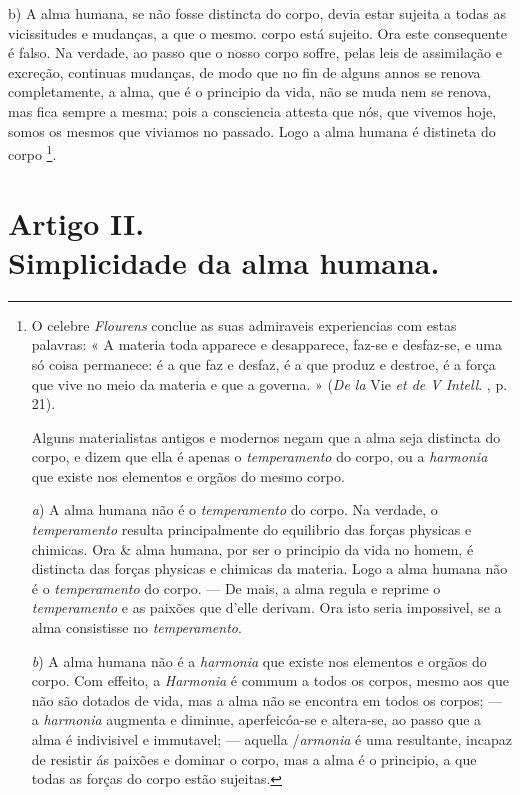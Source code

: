 b) A alma humana, se não fosse distincta do corpo, devia estar sujeita a todas as vicissitudes e mudanças, a que o mesmo. corpo está sujeito. Ora este consequente é falso. Na verdade, ao passo que o nosso corpo soffre, pelas leis de assimilação e excreção, continuas mudanças, de modo que no fin de alguns annos se renova completamente, a alma, que é o principio da vida, não se muda nem se renova, mas fica sempre a mesma; pois a consciencia attesta que nós, que   vivemos hoje, somos os mesmos que viviamos no passado. Logo a alma humana é distineta do corpo \footnote{O celebre \emph{Flourens} conclue as suas admiraveis experiencias com estas palavras: « A materia toda apparece e desapparece, faz-se e desfaz-se, e uma só coisa permanece: é a que faz e desfaz, é a que produz e destroe, é a força que vive no meio da materia e que a governa. » (\emph{De la} Vie \emph{et de V Intell}. , p. 21).\par Alguns materialistas antigos e modernos negam que a alma seja distincta do corpo, e dizem que ella é apenas o \emph{temperamento} do corpo, ou a \emph{harmonia} que existe nos elementos e orgãos do mesmo corpo.\par \emph{a}) A alma humana não é o \emph{temperamento} do corpo. Na verdade, o \emph{temperamento} resulta principalmente do equilibrio das forças physicas e chimicas. Ora \& alma humana, por ser o principio da vida no homem, é distincta das forças physicas e chimicas da materia. Logo a alma humana não é o \emph{temperamento} do corpo. --- De mais, a alma regula e reprime o \emph{temperamento} e as paixões que d'elle derivam. Ora isto seria impossivel, se a alma consistisse no \emph{temperamento}.\par \emph{b}) A alma humana não é a \emph{harmonia} que existe nos elementos e orgãos do corpo. Com effeito, a \emph{Harmonia} é commum a todos os corpos, mesmo aos que não são dotados de vida, mas a alma não se encontra em todos os corpos; --- a \emph{harmonia} augmenta e diminue, aperfeicóa-se e altera-se, ao passo que a alma é indivisivel e immutavel; --- aquella /\emph{armonia} é uma resultante, incapaz de resistir ás paixões e dominar o corpo, mas a alma é o principio, a que todas as forças do corpo estão sujeitas.}.


\section*{Artigo II.\\ Simplicidade da alma humana.}

